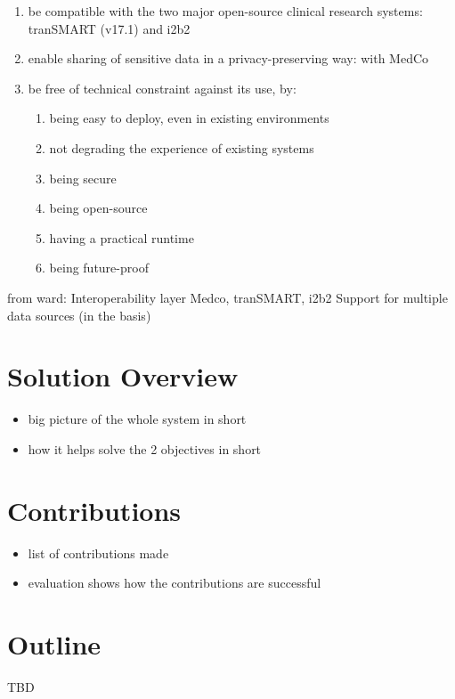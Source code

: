 \begin{enumerate}
    \item be compatible with the two major open-source clinical research systems: tranSMART (v17.1) and i2b2  %
    \item enable sharing of sensitive data in a privacy-preserving way: with MedCo
    \item be free of technical constraint against its use, by:
    \begin{enumerate}
        \item being easy to deploy, even in existing environments
        \item not degrading the experience of existing systems
        \item being secure
        \item being open-source
        \item having a practical runtime
        \item being future-proof
    \end{enumerate}
\end{enumerate}



from ward:
Interoperability layer
Medco, tranSMART, i2b2
Support for multiple data sources (in the basis)

\section{Solution Overview}

\begin{itemize}
    \item big picture of the whole system in short
    \item how it helps solve the 2 objectives in short
\end{itemize}


\section{Contributions}

\begin{itemize}
    \item list of contributions made
    \item evaluation shows how the contributions are successful
\end{itemize}


\section{Outline}
TBD
